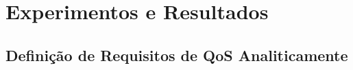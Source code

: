 \documentclass[xcolor=svgnames]{beamer}
\begin{document}

\section{Experimentos e Resultados}
\subsection{ Definição de Requisitos de QoS Analiticamente}
\end{document}
